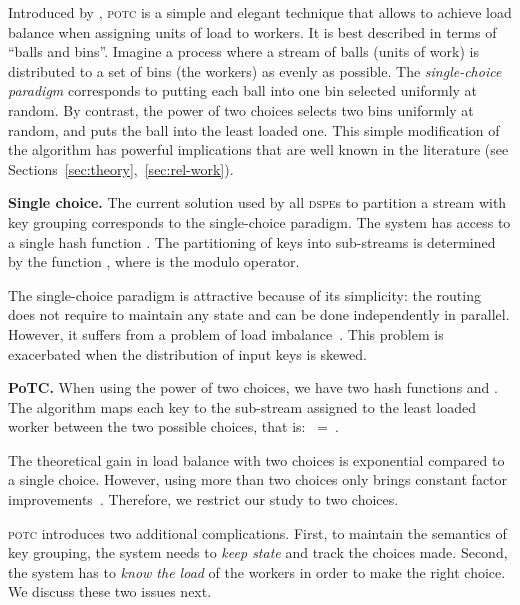 \documentclass[10pt,conference,letterpaper]{IEEEtran}
\newcommand{\spara}[1]{\smallskip\noindent\textbf{#1}}
\newcommand{\potc}{\textsc{p\textup{o}tc}\xspace}
\newcommand{\dspe}{\textsc{dspe}\xspace}
\newcommand{\dspes}{{\dspe}s\xspace}
\begin{document}
Introduced by \citet{azar1999balanced-allocations}, \potc is a simple and elegant technique that allows to achieve load balance when assigning units of load to workers.
It is best described in terms of ``balls and bins''.
Imagine a process where a stream of balls (units of work) is distributed to a set of bins (the workers) as evenly as possible.
The \emph{single-choice paradigm} corresponds to putting each ball into one bin selected uniformly at random.
By contrast, the power of two choices selects two bins uniformly at random, and puts the ball into the least loaded one.
This simple modification of the algorithm has powerful implications that are well known in the literature (see Sections~\ref{sec:theory},~\ref{sec:rel-work}). 









\spara{Single choice.}
The current solution used by all \dspes to partition a stream with key grouping corresponds to the single-choice paradigm.
The system has access to a single hash function .
The partitioning of keys into sub-streams is determined by the function ,
where  is the modulo operator.

The single-choice paradigm is attractive because of its simplicity: the routing does not require to maintain any state and can be done independently in parallel.
However, it suffers from a problem of load imbalance~\citep{mitzenmacher2001power}.
This problem is exacerbated when the distribution of input keys is skewed.


\spara{PoTC.}
When using the power of two choices, we have two hash functions  and .
The algorithm maps each key to the sub-stream assigned to the least loaded worker between the two possible choices, that is:
~=~.


The theoretical gain in load balance with two choices is exponential compared to a single choice.
However, using more than two choices only brings constant factor improvements~\citep{azar1999balanced-allocations}.
Therefore, we restrict our study to two choices.

\potc introduces two additional complications.
First, to maintain the semantics of key grouping, the system needs to \emph{keep state} and track the choices made.
Second, the system has to \emph{know the load} of the workers in order to make the right choice.
We discuss these two issues next.
\end{document}
